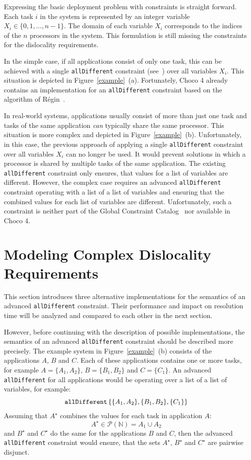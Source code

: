 \documentclass[english,biblatex]{lni}
\begin{document}
Expressing the basic deployment problem with constraints is straight forward.
Each task $i$ in the system is represented by an integer variable $X_i \in \{0, 1, \dots, n-1\}$. The domain of each variable $X_i$ corresponds to the indices of the $n$ processors in the system.
This formulation is still missing the constraints for the dislocality requirements.

In the simple case, if all applications consist of only one task, this can be achieved with a single \texttt{allDifferent} constraint (see~\cite{GCCAT2014}) over all variables $X_i$.
This situation is depicted in Figure~\ref{example}~(a).
Fortunately, Choco 4 already contains an implementation for an \texttt{allDifferent} constraint based on the algorithm of Régin~\cite{Regin1994}.

In real-world systems, applications usually consist of more than just one task and tasks of the same application \emph{can} typically share the same processor.
This situation is more complex and depicted in Figure~\ref{example}~(b).
Unfortunately, in this case, the previous approach of applying a single \texttt{allDifferent} constraint over all variables $X_i$ can no longer be used.
It would prevent solutions in which a processor is shared by multiple tasks of the same application.
The existing \texttt{allDifferent} constraint only ensures, that values for a list of variables are different.
However, the complex case requires an advanced \texttt{allDifferent} constraint operating with a list of a list of variables and ensuring that the combined values for each list of variables are different.
Unfortunately, such a constraint is neither part of the Global Constraint Catalog~\cite{GCCAT2014} nor available in Choco 4.

\section{Modeling Complex Dislocality Requirements}

This section introduces three alternative implementations for the semantics of an advanced \texttt{allDifferent} constraint.
Their performance and impact on resolution time will be analyzed and compared to each other in the next section.

However, before continuing with the description of possible implementations, the semantics of an advanced \texttt{allDifferent} constraint should be described more precisely.
The example system in Figure~\ref{example}~(b) consists of the applications $A$, $B$ and $C$.
Each of these applications contains one or more tasks, for example $A = \{A_1, A_2\}$, $B = \{B_1, B_2\}$ and $C = \{C_1\}$.
An advanced \texttt{allDifferent} for all applications would be operating over a list of a list of variables, for example:
$$\textrm{\texttt{allDifferent}}\left\{\{A_1, A_2\}, \{B_1, B_2\}, \{C_1\}\right\}$$
Assuming that $A^\star$ combines the values for each task in application $A$:
$$A^\star \in \mathcal{P}(\mathbb{N}) = A_1\cup A_2$$
and $B^\star$ and $C^\star$ do the same for the applications $B$ and $C$, then the advanced \texttt{allDifferent} constraint would ensure, that the sets $A^\star$, $B^\star$ and $C^\star$ are pairwise disjunct.
\end{document}
